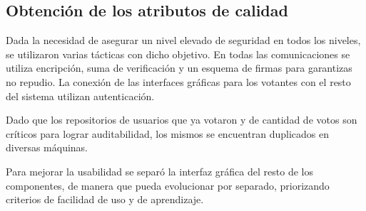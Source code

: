 \subsection{Obtención de los atributos de calidad}


Dada la necesidad de asegurar un nivel elevado de seguridad en todos los niveles, se utilizaron varias tácticas con dicho objetivo. En todas las comunicaciones se utiliza encripción, suma de verificación y un esquema de firmas para garantizas no repudio. La conexión de las interfaces gráficas para los votantes con el resto del sistema utilizan autenticación.


Dado que los repositorios de usuarios que ya votaron y de cantidad de votos son críticos para lograr auditabilidad, los mismos se encuentran duplicados en diversas máquinas.

Para mejorar la usabilidad se separó la interfaz gráfica del resto de los componentes, de manera que pueda evolucionar por separado, priorizando criterios de facilidad de uso y de aprendizaje.


 
